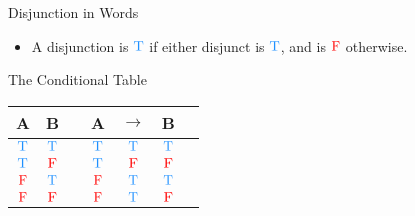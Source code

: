 \documentclass[
  ignorenonframetext,
]{beamer}
\providecommand{\tightlist}{%
  \setlength{\itemsep}{0pt}\setlength{\parskip}{0pt}}
\renewcommand{\,}{\text{, }}
\def\True{\textcolor{dodgerblue}{\text{T}}}
\def\False{\textcolor{red}{\text{F}}}
\begin{document}
\begin{frame}{Disjunction in Words}
\protect\hypertarget{disjunction-in-words}{}

\begin{itemize}
\tightlist
\item
  A disjunction is \(\True\) if either disjunct is \(\True\), and is
  \(\False\) otherwise.
\end{itemize}

\end{frame}

\begin{frame}{The Conditional Table}
\protect\hypertarget{the-conditional-table}{}

\begin{center}
\begin{tabular}{@{ }c@{ }@{ }c | c@{ }@{ }c@{ }@{ }c@{ }@{ }c@{ }@{ }c}
A & B &  & A & $\rightarrow$ & B & \\
\hline 
$\True$ & $\True$ &  & $\True$ & \textcolor{red}{$\True$} & $\True$ & \\
$\True$ & $\False$ &  & $\True$ & \textcolor{red}{$\False$} & $\False$ & \\
$\False$ & $\True$ &  & $\False$ & \textcolor{red}{$\True$} & $\True$ & \\
$\False$ & $\False$ &  & $\False$ & \textcolor{red}{$\True$} & $\False$ & \\
\end{tabular}
\end{center}

\end{frame}
\end{document}
